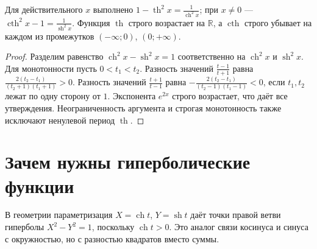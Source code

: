 \ifdim\dimexpr\ht\CatFlowBox+\dp\CatFlowBox\relax<64mm\dp\CatFlowBox=\dimexpr64mm-\ht\CatFlowBox\relax\fi%
\noindent\usebox{\CatFlowBox}\par\addvspace{5pt}
\begin{theorem}\label{thm:legacy-c14-5}
Для действительного \(x\) выполнено \(1-\operatorname{th}^2x=\frac1{\operatorname{ch}^2x}\); при \(x\ne0\) — \(\operatorname{cth}^2x-1=\frac1{\operatorname{sh}^2x}\). Функция \(\operatorname{th}\) строго возрастает на \(\mathbb R\), а \(\operatorname{cth}\) строго убывает на каждом из промежутков \((-\infty;0)\), \((0;+\infty)\).
\end{theorem}
\begin{proof}
Разделим равенство \(\operatorname{ch}^2x-\operatorname{sh}^2x=1\) соответственно на \(\operatorname{ch}^2x\) и \(\operatorname{sh}^2x\). Для монотонности пусть \(0<t_1<t_2\). Разность значений \(\frac{t-1}{t+1}\) равна \(\frac{2(t_2-t_1)}{(t_2+1)(t_1+1)}>0\). Разность значений \(\frac{t+1}{t-1}\) равна \(-\frac{2(t_2-t_1)}{(t_2-1)(t_1-1)}<0\), если \(t_1,t_2\) лежат по одну сторону от \(1\). Экспонента \(e^{2x}\) строго возрастает, что даёт все утверждения. Неограниченность аргумента и строгая монотонность также исключают ненулевой период \(\operatorname{th}\).
\end{proof}

\section{Зачем нужны гиперболические функции}
В геометрии параметризация \(X=\operatorname{ch}t\), \(Y=\operatorname{sh}t\) даёт точки правой ветви гиперболы \(X^2-Y^2=1\), поскольку \(\operatorname{ch}t>0\). Это аналог связи косинуса и синуса с окружностью, но с разностью квадратов вместо суммы.

